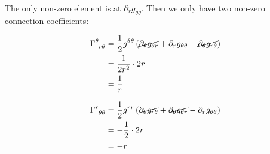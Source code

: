 The only non-zero element is at $\partial_r g_{\theta \theta}$. Then we only have two non-zero connection coefficients:
\begin{minipage}[t]{0.48\textwidth}
\begin{align*}
\tensor{\Gamma}{^\theta _{r\theta}} &= \frac{1}{2}g^{\theta \theta}\left(\cancel{\partial_\theta g_{\theta r}} + \partial_r g_{\theta \theta} - \cancel{\partial_\theta g_{r \theta}}\right) \\
&= \frac{1}{2r^2} \cdot 2r \\
&= \frac{1}{r}
\end{align*}
\end{minipage}
\hfill
\begin{minipage}[t]{0.48\textwidth}
\begin{align*}
\tensor{\Gamma}{^r _{\theta \theta}} &= \frac{1}{2}g^{r r}\left(\cancel{\partial_\theta g_{r \theta}} + \cancel{\partial_\theta g_{\theta r}} - \partial_r g_{\theta \theta}\right) \\
&= -\frac{1}{2} \cdot 2r \\
&= -r
\end{align*}
\end{minipage}
